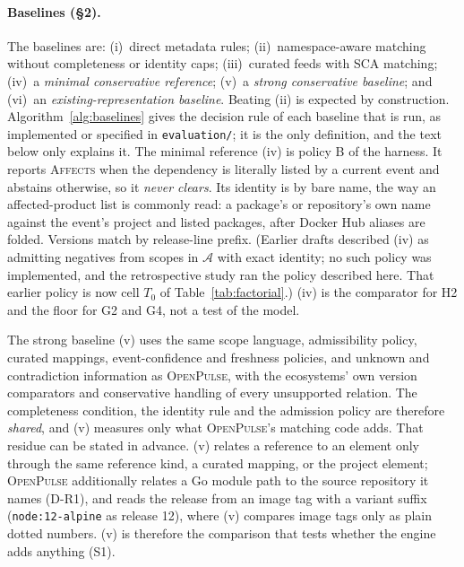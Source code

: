 \documentclass[11pt,a4paper]{article}
\newcommand{\op}{\textsc{OpenPulse}}
\newcommand{\code}[1]{\texttt{#1}}
\begin{document}
\paragraph{Baselines (\S2).} The baselines are: (i)~direct metadata
rules; (ii)~namespace-aware matching without completeness or identity
caps; (iii)~curated feeds with SCA matching; (iv)~a \emph{minimal
conservative reference}; (v)~a \emph{strong conservative baseline};
and (vi)~an \emph{existing-representation baseline}. Beating (ii) is
expected by construction. Algorithm~\ref{alg:baselines} gives the
decision rule of each baseline that is run, as implemented or specified
in \code{evaluation/}; it is the only definition, and the text below
only explains it. The minimal reference (iv) is policy B of the
harness. It reports \textsc{Affects} when the dependency is literally
listed by a current event and abstains otherwise, so it \emph{never
clears}. Its identity is by bare name, the way an affected-product list
is commonly read: a package's or repository's own name against the
event's project and listed packages, after Docker Hub aliases are
folded. Versions match by release-line prefix. (Earlier drafts
described (iv) as admitting negatives from scopes in $\mathcal{A}$ with
exact identity; no such policy was implemented, and the retrospective
study ran the policy described here. That earlier policy is now cell
$T_0$ of Table~\ref{tab:factorial}.) (iv) is the comparator for H2 and
the floor for G2 and G4, not a test of the model.

The strong baseline (v) uses the same scope language, admissibility
policy, curated mappings, event-confidence and freshness policies, and
unknown and contradiction information as \op{}, with the ecosystems'
own version comparators and conservative handling of every unsupported
relation. The completeness condition, the identity rule and the
admission policy are therefore \emph{shared}, and (v) measures only
what \op{}'s matching code adds. That residue can be stated in advance.
(v) relates a reference to an element only through the same reference
kind, a curated mapping, or the project element; \op{} additionally
relates a Go module path to the source repository it names (D-R1), and
reads the release from an image tag with a variant suffix
(\code{node:12-alpine} as release 12), where (v) compares image tags
only as plain dotted numbers. (v) is therefore the comparison that
tests whether the engine adds anything (S1).
\end{document}
